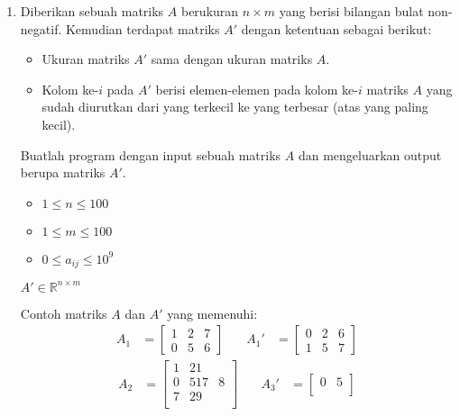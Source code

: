 \documentclass{article}
\newcommand{\R}{\mathbb{R}}
\begin{document}
\begin{enumerate}
    \item Diberikan sebuah matriks $A$ berukuran $n \times m$ yang berisi bilangan bulat non-negatif. Kemudian terdapat matriks $A'$ dengan ketentuan sebagai berikut:
    \begin{itemize}
      \item Ukuran matriks $A'$ sama dengan ukuran matriks $A$.
      \item Kolom ke-$i$ pada $A'$ berisi elemen-elemen pada kolom ke-$i$ matriks $A$ yang sudah diurutkan dari yang terkecil ke yang terbesar (atas yang paling kecil). 
    \end{itemize}
    Buatlah program dengan input sebuah matriks $A$ dan mengeluarkan output berupa matriks $A'$.
    \begin{req}
        \begin{itemize}
            \item $1 \leq n \leq 100$
            \item $1 \leq m \leq 100$
            \item  $0 \leq a_{ij} \leq 10^9$
        \end{itemize}
    \end{req}
    \begin{out}
        $A'\in \R^{n \times m}$
    \end{out}
    \begin{example}
        Contoh matriks $A$ dan $A'$ yang memenuhi:
        \begin{align*}
            A_1 &= \begin{bmatrix}
                1 & 2 & 7 \\
                0 & 5 & 6 
            \end{bmatrix} &\quad
            A_1' &= \begin{bmatrix}
                0 & 2 & 6 \\
                1 & 5 & 7
            \end{bmatrix}
        \end{align*}
        \begin{align*}
            A_2 &= \begin{bmatrix}
                1 & 21 \\
                0 & 5 
                17& 8\\
                7 & 29\\
            \end{bmatrix} &\quad
            A_3' &= \begin{bmatrix}
                0 & 5 \\

\end{bmatrix}
\end{align*}
\end{example}
\end{enumerate}
\end{document}
